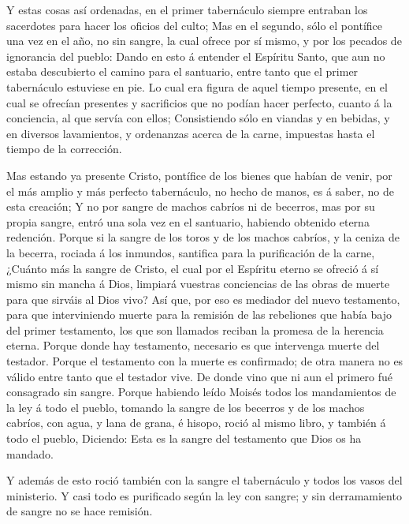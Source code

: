 Y estas cosas así ordenadas, en el primer tabernáculo
siempre entraban los sacerdotes para hacer los oficios del culto;
 Mas en el segundo, sólo el pontífice una vez en el año, no
sin sangre, la cual ofrece por sí mismo, y por los pecados de ignorancia
del pueblo:  Dando en esto á entender el Espíritu Santo, que
aun no estaba descubierto el camino para el santuario, entre tanto que
el primer tabernáculo estuviese en pie.  Lo cual era figura
de aquel tiempo presente, en el cual se ofrecían presentes y sacrificios
que no podían hacer perfecto, cuanto á la conciencia, al que servía con
ellos;  Consistiendo sólo en viandas y en bebidas, y en
diversos lavamientos, y ordenanzas acerca de la carne, impuestas hasta
el tiempo de la corrección.

 Mas estando ya presente Cristo, pontífice de los bienes
que habían de venir, por el más amplio y más perfecto tabernáculo, no
hecho de manos, es á saber, no de esta creación;  Y no por
sangre de machos cabríos ni de becerros, mas por su propia sangre, entró
una sola vez en el santuario, habiendo obtenido eterna redención.
 Porque si la sangre de los toros y de los machos cabríos,
y la ceniza de la becerra, rociada á los inmundos, santifica para la
purificación de la carne,  ¿Cuánto más la sangre de Cristo,
el cual por el Espíritu eterno se ofreció á sí mismo sin mancha á Dios,
limpiará vuestras conciencias de las obras de muerte para que sirváis al
Dios vivo?  Así que, por eso es mediador del nuevo
testamento, para que interviniendo muerte para la remisión de las
rebeliones que había bajo del primer testamento, los que son llamados
reciban la promesa de la herencia eterna.  Porque donde hay
testamento, necesario es que intervenga muerte del testador.
 Porque el testamento con la muerte es confirmado; de otra
manera no es válido entre tanto que el testador vive.  De
donde vino que ni aun el primero fué consagrado sin sangre.
 Porque habiendo leído Moisés todos los mandamientos de la
ley á todo el pueblo, tomando la sangre de los becerros y de los machos
cabríos, con agua, y lana de grana, é hisopo, roció al mismo libro, y
también á todo el pueblo,  Diciendo: Esta es la sangre del
testamento que Dios os ha mandado.

 Y además de esto roció también con la sangre el
tabernáculo y todos los vasos del ministerio.  Y casi todo
es purificado según la ley con sangre; y sin derramamiento de sangre no
se hace remisión.

